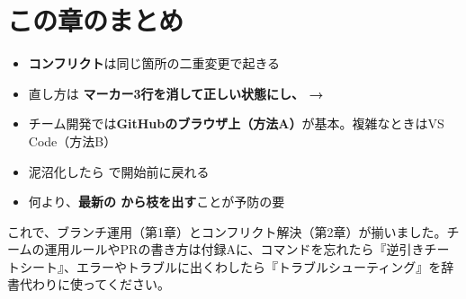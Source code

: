 \section*{この章のまとめ}

\begin{itemize}[leftmargin=1.4em]
  \item \textbf{コンフリクト}は同じ箇所の二重変更で起きる
  \item 直し方は \textbf{マーカー3行を消して正しい状態にし、 → }
  \item チーム開発では\textbf{GitHubのブラウザ上（方法A）}が基本。複雑なときはVS Code（方法B）
  \item 泥沼化したら \textbf{} で開始前に戻れる
  \item 何より、\textbf{最新の  から枝を出す}ことが予防の要
\end{itemize}

これで、ブランチ運用（第1章）とコンフリクト解決（第2章）が揃いました。チームの運用ルールやPRの書き方は付録Aに、コマンドを忘れたら『逆引きチートシート』、エラーやトラブルに出くわしたら『トラブルシューティング』を辞書代わりに使ってください。
